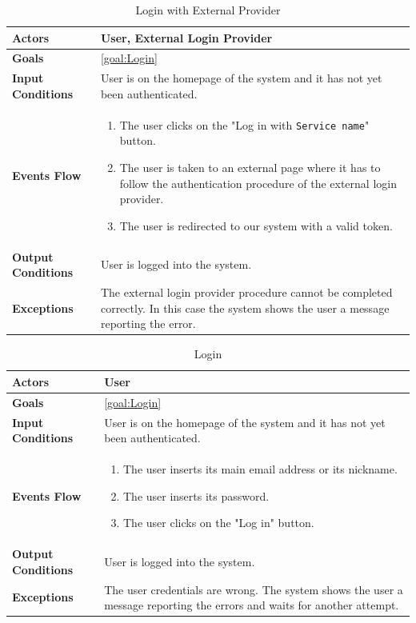 \begin{table}[H]
	\centering
	\def\arraystretch{1.5}
	\begin{tabular}{|m{7cm}|m{7cm}|}
		\hline
		\textbf{Actors}            & User, External Login Provider		    \\ \hline
		\textbf{Goals}             & \ref{goal:Login}           \\ \hline
		\textbf{Input Conditions}  & User is on the homepage of the system and it has not yet been authenticated.           \\ \hline
		\textbf{Events Flow}       &    
		\begin{enumerate}
			\item The user clicks on the "Log in with \texttt{Service name}" button.
			\item The user is taken to an external page where it has to follow the authentication procedure of the external login provider.
			\item The user is redirected to our system with a valid token.
		\end{enumerate} \\ \hline
		\textbf{Output Conditions} & User is logged into the system.          \\ \hline
		\textbf{Exceptions}        & The external login provider procedure cannot be completed correctly. In this case the system shows the user a message reporting the error.         \\ \hline
	\end{tabular}
	\caption{Login with External Provider\label{UseCaseDescr:LoginExternal}}
\end{table}

\begin{table}[H]
	\centering
	\def\arraystretch{1.5}
	\begin{tabular}{|m{7cm}|m{7cm}|}
		\hline
		\textbf{Actors}            & User	    \\ \hline
		\textbf{Goals}             & \ref{goal:Login}           \\ \hline
		\textbf{Input Conditions}  & User is on the homepage of the system and it has not yet been authenticated.           \\ \hline
		\textbf{Events Flow}       &    
			 	\begin{enumerate}
			 		\item The user inserts its main email address or its nickname.
			 		\item The user inserts its password.
			 		\item The user clicks on the "Log in" button.
			 	\end{enumerate}\\ \hline
		\textbf{Output Conditions} & User is logged into the system.          \\ \hline
		\textbf{Exceptions}        & The user credentials are wrong. The system shows the user a message reporting the errors and waits for another attempt.         \\ \hline
	\end{tabular}
	\caption{Login\label{UseCaseDescr:LoginNormal}}
\end{table}

